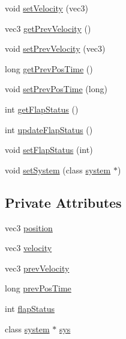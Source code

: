 \begin{DoxyCompactItemize}
\item 
void \mbox{\hyperlink{classpredator_ab10d8ac5e3e4200bc94ed1b3a4122d20}{set\+Velocity}} (vec3)
\item 
vec3 \mbox{\hyperlink{classpredator_afbcd7455722b197a8c0c34d75f6c4c1c}{get\+Prev\+Velocity}} ()
\item 
void \mbox{\hyperlink{classpredator_aa2995b4172c462623436fd763142a729}{set\+Prev\+Velocity}} (vec3)
\item 
long \mbox{\hyperlink{classpredator_a4b8cbd5f3a26468a8c870f65d30e4b32}{get\+Prev\+Pos\+Time}} ()
\item 
void \mbox{\hyperlink{classpredator_a5420af60b3c705b66dbaaae6edaaa439}{set\+Prev\+Pos\+Time}} (long)
\item 
int \mbox{\hyperlink{classpredator_ab1017c980ef1d3b5043cc2bb12ab907c}{get\+Flap\+Status}} ()
\item 
int \mbox{\hyperlink{classpredator_a7c645f016c96f8cee0ec48c764eb2d91}{update\+Flap\+Status}} ()
\item 
void \mbox{\hyperlink{classpredator_ac62b9ec636df79dabf4201c46071b7ba}{set\+Flap\+Status}} (int)
\item 
void \mbox{\hyperlink{classpredator_af6bcdf0191bac594ef337d3aeff9d58a}{set\+System}} (class \mbox{\hyperlink{classsystem}{system}} $\ast$)
\end{DoxyCompactItemize}
\subsection*{Private Attributes}
\begin{DoxyCompactItemize}
\item 
vec3 \mbox{\hyperlink{classpredator_a9cd8ddd5c29b1df1065ba56edb19918a}{position}}
\item 
vec3 \mbox{\hyperlink{classpredator_aa515213888cc078cc3cc4d499d310f4f}{velocity}}
\item 
vec3 \mbox{\hyperlink{classpredator_a5e1ec6c8df7baefd2578738ff18346cc}{prev\+Velocity}}
\item 
long \mbox{\hyperlink{classpredator_a6264c5588a903f0623826a8d283b576b}{prev\+Pos\+Time}}
\item 
int \mbox{\hyperlink{classpredator_a69841e6dcdd17a8f14b86df35627f5c4}{flap\+Status}}
\item 
class \mbox{\hyperlink{classsystem}{system}} $\ast$ \mbox{\hyperlink{classpredator_a46029432880eb6c8b11edd70cc1468a2}{sys}}
\end{DoxyCompactItemize}


